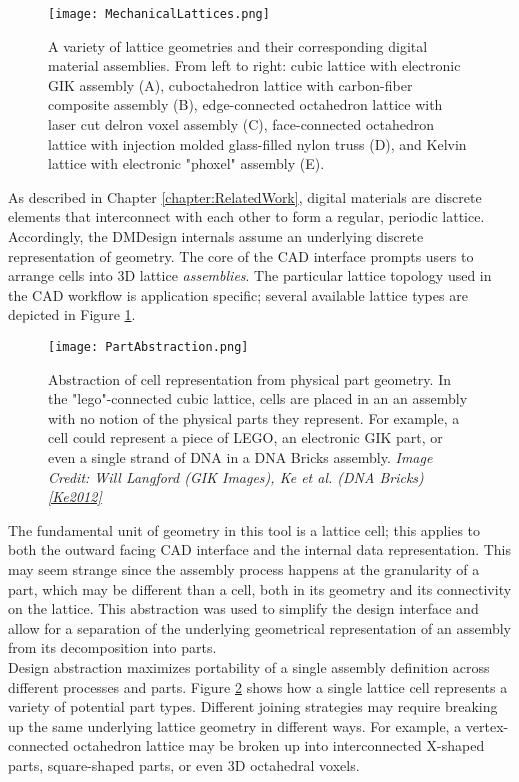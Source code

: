 {\begin{figure}
  \texttt{[image: MechanicalLattices.png]}
  \caption{A variety of lattice geometries and their corresponding digital material assemblies.  From left to right: cubic lattice with electronic GIK assembly (A), cuboctahedron lattice with carbon-fiber composite assembly (B), edge-connected octahedron lattice with laser cut delron voxel assembly (C), face-connected octahedron lattice with injection molded glass-filled nylon truss (D), and Kelvin lattice with electronic "phoxel" assembly (E).}
  \label{fig:MechanicalLattices}
\end{figure}

As described in Chapter \ref{chapter:RelatedWork}, digital materials are discrete elements that interconnect with each other to form a regular, periodic lattice.  Accordingly, the DMDesign internals assume an underlying discrete representation of geometry.  The core of the CAD interface prompts users to arrange cells into 3D lattice \textit{assemblies}.  The particular lattice topology used in the CAD workflow is application specific; several available lattice types are depicted in Figure \ref{fig:MechanicalLattices}.\\

\begin{figure}
  \texttt{[image: PartAbstraction.png]}
  \caption{Abstraction of cell representation from physical part geometry.  In the "lego"-connected cubic lattice, cells are placed in an an assembly with no notion of the physical parts they represent.  For example, a cell could represent a piece of LEGO, an electronic GIK part, or even a single strand of DNA in a DNA Bricks assembly.  \textit{Image Credit: Will Langford (GIK Images), Ke et al. (DNA Bricks) \ref{Ke2012}}}
  \label{fig:PartAbstraction}
\end{figure}

The fundamental unit of geometry in this tool is a lattice cell; this applies to both the outward facing CAD interface and the internal data representation.  This may seem strange since the assembly process happens at the granularity of a part, which may be different than a cell, both in its geometry and its connectivity on the lattice.  This abstraction was used to simplify the design interface and allow for a separation of the underlying geometrical representation of an assembly from its decomposition into parts.\\

Design abstraction maximizes portability of a single assembly definition across different processes and parts.  Figure \ref{fig:PartAbstraction} shows how a single lattice cell represents a variety of potential part types.  Different joining strategies may require breaking up the same underlying lattice geometry in different ways.  For example, a vertex-connected octahedron lattice may be broken up into interconnected X-shaped parts, square-shaped parts, or even 3D octahedral voxels.  

}
